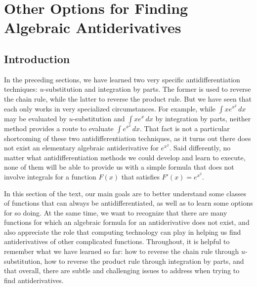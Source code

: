 \section{Other Options for Finding Algebraic Antiderivatives} \label{S:5.5.OtherOpt}

\vspace*{-14 pt}

\subsection*{Introduction}

In the preceding sections, we have learned two very specific antidifferentiation techniques:  $u$-substitution and integration by parts.  The former is used to reverse the chain rule, while the latter to reverse the product rule.  But we have seen that each only works in very specialized circumstances.  For example, while $\int xe^{x^2} \, dx$ may be evaluated by $u$-substitution and $\int x e^x \, dx$ by integration by parts, neither method provides a route to evaluate $\int e^{x^2} \, dx$.  That fact is not a particular shortcoming of these two antidifferentiation techniques, as it turns out there does not exist an elementary algebraic antiderivative for $e^{x^2}$.  Said differently, no matter what antidifferentiation methods we could develop and learn to execute, none of them will be able to provide us with a simple formula that does not involve integrals for a function $F(x)$ that satisfies $F'(x) = e^{x^2}$.

In this section of the text, our main goals are to better understand some classes of functions that can always be antidifferentiated, as well as to learn some options for so doing.  At the same time, we want to recognize that there are many functions for which an algebraic formula for an antiderivative does not exist, and also appreciate the role that computing technology can play in helping us find antiderivatives of other complicated functions.  Throughout, it is helpful to remember what we have learned so far: how to reverse the chain rule through $u$-substitution, how to reverse the product rule through integration by parts, and that overall, there are subtle and challenging issues to address when trying to find antiderivatives. 

